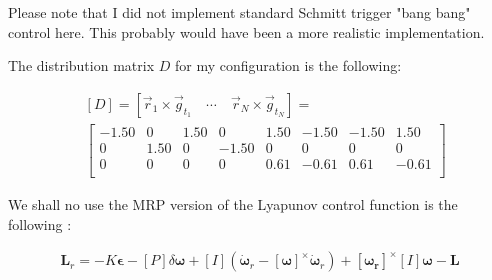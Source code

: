 Please note that I did not implement standard Schmitt trigger "bang bang" control here. This probably would have been a more realistic implementation.



The distribution matrix $D$ for my configuration is the following:

\begin{align*}
& \left[D \right] = \left[\vec{r}_1 \times \vec{g}_{t_1} \quad \cdots \quad \vec{r}_N\times \vec{g}_{t_N}\right]  = \\
&\begin{bmatrix}
   -1.50   &      0   & 1.50  &       0  &  1.50  & -1.50 &  -1.50  &  1.50 \\
         0   & 1.50   &      0  & -1.50  &       0  &       0 &        0  &       0 \\
         0   &      0   &      0  &       0  &  0.61  & -0.61 &   0.61  & -0.61 \\
\end{bmatrix}
\end{align*}

We shall no use the MRP version of the Lyapunov control function is the following \cite{sj}:

\begin{align}
\mathbf{L}_r = -K\mathbf{\epsilon} - \left[P\right]\delta\mathbf{\omega} +
\left[I\right](\dot{\mathbf{\omega}}_r - \left[\mathbf{\omega}\right]^{\times}\dot{\mathbf{\omega}}_r) + \left[\mathbf{\omega_r}\right]^{\times}\left[I\right]\mathbf{\omega} - \mathbf{L}
\end{align}

